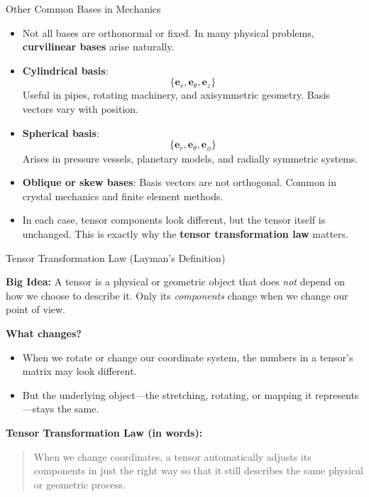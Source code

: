 \documentclass[aspectratio=169,11pt]{beamer}
\begin{document}
\begin{frame}{Other Common Bases in Mechanics}

\begin{itemize}

    \item Not all bases are orthonormal or fixed.
          In many physical problems, \textbf{curvilinear bases} arise naturally.

    \item \textbf{Cylindrical basis}:
          \[
              \{\mathbf{e}_r, \mathbf{e}_\theta, \mathbf{e}_z\}
          \]
          Useful in pipes, rotating machinery, and axisymmetric geometry.
          Basis vectors vary with position.

    \item \textbf{Spherical basis}:
          \[
              \{\mathbf{e}_r, \mathbf{e}_\theta, \mathbf{e}_\phi\}
          \]
          Arises in pressure vessels, planetary models, and radially symmetric systems.

    \item \textbf{Oblique or skew bases}:
          Basis vectors are not orthogonal.
          Common in crystal mechanics and finite element methods.

    \item In each case, tensor components look different,
          but the tensor itself is unchanged.
          This is exactly why the \textbf{tensor transformation law} matters.

\end{itemize}

\end{frame}


\begin{frame}{Tensor Transformation Law (Layman’s Definition)}

\textbf{Big Idea:}  
A tensor is a physical or geometric object that does \emph{not} depend on how we choose
to describe it.  
Only its \emph{components} change when we change our point of view.

\medskip

\textbf{What changes?}  
\begin{itemize}
    \item When we rotate or change our coordinate system, the numbers in a tensor's
          matrix may look different.
    \item But the underlying object—the stretching, rotating, or mapping it represents—stays the same.
\end{itemize}

\medskip

\textbf{Tensor Transformation Law (in words):}  
\begin{quote}
When we change coordinates, a tensor automatically adjusts its components in just the
right way so that it still describes the same physical or geometric process.
\end{quote}

\end{frame}
\end{document}
